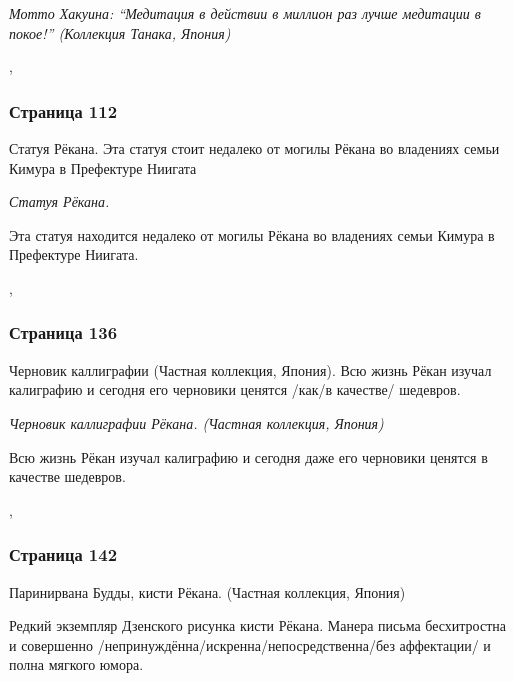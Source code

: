 \begin{ver}[1]\it
Мотто Хакуина: ``Медитация в действии в миллион раз лучше
медитации в покое!'' (Коллекция Танака, Япония)
\end{ver}
\sep

\subsubsection{Страница 112}
\begin{ver}
Статуя Рёкана. Эта статуя стоит недалеко от могилы Рёкана во владениях
семьи Кимура в Префектуре Ниигата
\end{ver}

\begin{ver}[1]\it
Статуя Рёкана. 
\end{ver}

\begin{ver}[1]
Эта статуя находится недалеко от могилы Рёкана во владениях
семьи Кимура в Префектуре Ниигата.
\end{ver}
\sep
 
\subsubsection{Страница 136}
\begin{ver}
Черновик каллиграфии (Частная коллекция, Япония). Всю жизнь Рёкан
изучал калиграфию и сегодня его черновики ценятся /как/в качестве/ шедевров. 
\end{ver}

\begin{ver}[1]\it
Черновик каллиграфии Рёкана. (Частная коллекция, Япония)
\end{ver}

\begin{ver}[1]
Всю жизнь Рёкан изучал калиграфию и сегодня даже его черновики ценятся
в качестве шедевров.
\end{ver}
\sep
 
\subsubsection{Страница 142}
\begin{ver}
Паринирвана Будды, кисти Рёкана. (Частная коллекция, Япония)

Редкий экземпляр Дзенского рисунка кисти Рёкана. Манера письма
бесхитростна и совершенно /непринуждённа/искренна/непосредственна/без
аффектации/ и полна мягкого юмора.
\end{ver}

